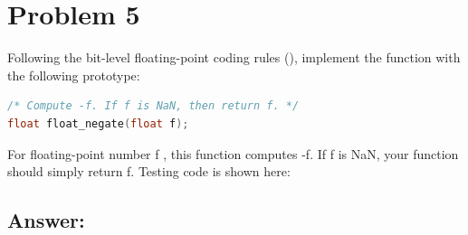 
\section*{Problem 5}
\label{p5}

Following the bit-level floating-point coding rules (), implement the function with the following prototype:

\begin{lstlisting}[frame=tb, language=C++]
/* Compute -f. If f is NaN, then return f. */
float float_negate(float f);
\end{lstlisting}

\noindent For floating-point number f , this function computes -f. 
If f is NaN, your function should simply return f.
Testing code is shown here:



\subsection*{Answer:}
